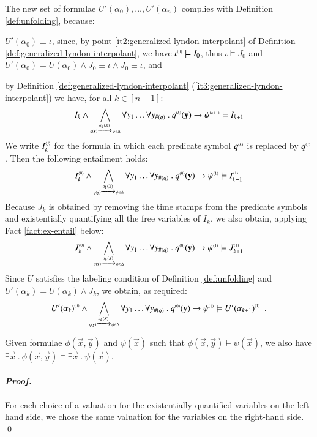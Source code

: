The new set of formulae $U'(\alpha_0), \ldots, U'(\alpha_n)$ complies
with Definition \ref{def:unfolding}, because: \begin{compactitem}
\item $U'(\alpha_0) \equiv \iota$, since, by point
  \ref{it2:generalized-lyndon-interpolant} of Definition
  \ref{def:generalized-lyndon-interpolant}, we have ${\iota}^{\scriptscriptstyle{({0})}}
  \models I_0$, thus $\iota \models J_0$ and $U'(\alpha_0) =
  U(\alpha_0) \wedge J_0 \equiv \iota \wedge J_0 \equiv \iota$, and
\item by Definition \ref{def:generalized-lyndon-interpolant}
  (\ref{it3:generalized-lyndon-interpolant}) we have, for all $k \in
  [n-1]$:
  \[I_k \wedge \bigwedge_{\scriptscriptstyle{q(\mathbf y) \xrightarrow{{\scriptscriptstyle a_k(X)}}_{{\scriptstyle }} \psi \in \Delta}} 
  \forall y_1 \ldots \forall y_{\#(q)} ~.~ {q}^{\scriptscriptstyle{({k})}}(\mathbf y)
  \rightarrow {\psi}^{\scriptscriptstyle{({k+1})}} \models I_{k+1}\] We write
  ${I}^{\scriptscriptstyle{\langle{j}\rangle}}_k$ for the formula in which each predicate
  symbol ${q}^{\scriptscriptstyle{({k})}}$ is replaced by ${q}^{\scriptscriptstyle{({j})}}$. Then the
  following entailment holds:
  \[{I}^{\scriptscriptstyle{\langle{0}\rangle}}_k \wedge \bigwedge_{\scriptscriptstyle{q(\mathbf y) \xrightarrow{{\scriptscriptstyle a_k(X)}}_{{\scriptstyle }} \psi \in \Delta}} 
  \forall y_1 \ldots \forall y_{\#(q)} ~.~ {q}^{\scriptscriptstyle{({0})}}(\mathbf y)
  \rightarrow {\psi}^{\scriptscriptstyle{({1})}} \models {I}^{\scriptscriptstyle{\langle{1}\rangle}}_{k+1}\]
  Because $J_k$ is obtained by removing the time stamps from the predicate symbols and  
  existentially quantifying all the free variables of $I_k$, we also
  obtain, applying Fact \ref{fact:ex-entail} below:
  \[{J}^{\scriptscriptstyle{({0})}}_k \wedge \bigwedge_{\scriptscriptstyle{q(\mathbf y) \xrightarrow{{\scriptscriptstyle a_k(X)}}_{{\scriptstyle }} \psi \in \Delta}} 
  \forall y_1 \ldots \forall y_{\#(q)} ~.~ {q}^{\scriptscriptstyle{({0})}}(\mathbf y)
  \rightarrow {\psi}^{\scriptscriptstyle{({1})}} \models {J}^{\scriptscriptstyle{({1})}}_{k+1}\] Since $U$
  satisfies the labeling condition of Definition \ref{def:unfolding}
  and $U'(\alpha_k) = U(\alpha_k) \wedge J_k$, we obtain, as required:
  \[{U'(\alpha_k)}^{\scriptscriptstyle{({0})}} \wedge \bigwedge_{\scriptscriptstyle{q(\mathbf y) \xrightarrow{{\scriptscriptstyle a_k(X)}}_{{\scriptstyle }} \psi \in \Delta}} 
  \forall y_1 \ldots \forall y_{\#(q)} ~.~ {q}^{\scriptscriptstyle{({0})}}(\mathbf y)
  \rightarrow {\psi}^{\scriptscriptstyle{({1})}} \models
  {U'(\alpha_{k+1})}^{\scriptscriptstyle{({1})}}\enspace.\]
\end{compactitem}  

\begin{fact}\label{fact:ex-entail}
  Given formulae $\phi(\vec{x}, \vec{y})$ and $\psi(\vec{x})$ such
  that $\phi(\vec{x}, \vec{y}) \models \psi(\vec{x})$, we also have
  $\exists \vec{x} ~.~ \phi(\vec{x},\vec{y}) \models \exists \vec{x}
  ~.~ \psi(\vec{x})$. 
\end{fact}
\paragraph{\em Proof.} For each choice of a valuation for the existentially
quantified variables on the left-hand side, we chose the same
valuation for the variables on the right-hand side. \qed 
